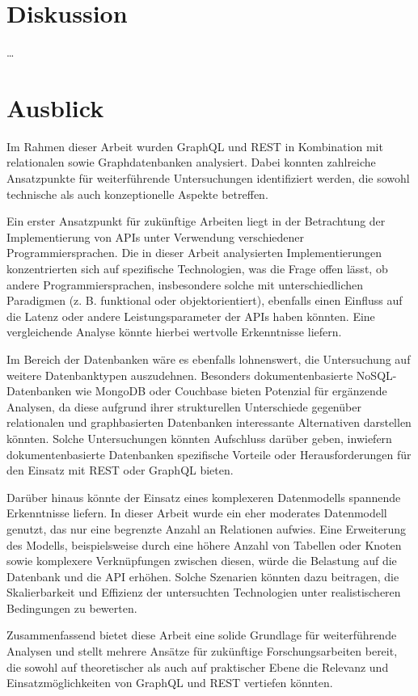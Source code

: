 \chapter{Diskussion} %
\label{sec:diskussion}

\ldots

\chapter{Ausblick} %
\label{sec:ausblick}
Im Rahmen dieser Arbeit wurden GraphQL und REST in Kombination mit relationalen sowie Graphdatenbanken analysiert. Dabei konnten zahlreiche Ansatzpunkte für weiterführende Untersuchungen identifiziert werden, die sowohl technische als auch konzeptionelle Aspekte betreffen.

\noindent
Ein erster Ansatzpunkt für zukünftige Arbeiten liegt in der Betrachtung der Implementierung von APIs unter Verwendung verschiedener Programmiersprachen. Die in dieser Arbeit analysierten Implementierungen konzentrierten sich auf spezifische Technologien, was die Frage offen lässt, ob andere Programmiersprachen, insbesondere solche mit unterschiedlichen Paradigmen (z. B. funktional oder objektorientiert), ebenfalls einen Einfluss auf die Latenz oder andere Leistungsparameter der APIs haben könnten. Eine vergleichende Analyse könnte hierbei wertvolle Erkenntnisse liefern.

\noindent
Im Bereich der Datenbanken wäre es ebenfalls lohnenswert, die Untersuchung auf weitere Datenbanktypen auszudehnen. Besonders dokumentenbasierte NoSQL-Datenbanken wie MongoDB oder Couchbase bieten Potenzial für ergänzende Analysen, da diese aufgrund ihrer strukturellen Unterschiede gegenüber relationalen und graphbasierten Datenbanken interessante Alternativen darstellen könnten. Solche Untersuchungen könnten Aufschluss darüber geben, inwiefern dokumentenbasierte Datenbanken spezifische Vorteile oder Herausforderungen für den Einsatz mit REST oder GraphQL bieten.

\noindent
Darüber hinaus könnte der Einsatz eines komplexeren Datenmodells spannende Erkenntnisse liefern. In dieser Arbeit wurde ein eher moderates Datenmodell genutzt, das nur eine begrenzte Anzahl an Relationen aufwies. Eine Erweiterung des Modells, beispielsweise durch eine höhere Anzahl von Tabellen oder Knoten sowie komplexere Verknüpfungen zwischen diesen, würde die Belastung auf die Datenbank und die API erhöhen. Solche Szenarien könnten dazu beitragen, die Skalierbarkeit und Effizienz der untersuchten Technologien unter realistischeren Bedingungen zu bewerten.

\noindent
Zusammenfassend bietet diese Arbeit eine solide Grundlage für weiterführende Analysen und stellt mehrere Ansätze für zukünftige Forschungsarbeiten bereit, die sowohl auf theoretischer als auch auf praktischer Ebene die Relevanz und Einsatzmöglichkeiten von GraphQL und REST vertiefen könnten.

